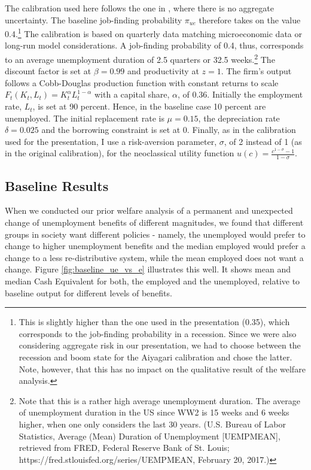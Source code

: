 \documentclass[a4paper,11pt]{article}
\begin{document}
The calibration used here follows the one in \cite{DenHaan20101}, where there is no aggregate uncertainty. The baseline job-finding probability $\pi_{ue}$ therefore takes on the value 0.4.\footnote{This is slightly higher than the one used in the presentation (0.35), which corresponds to the job-finding probability in a recession. Since we were also considering aggregate risk in our presentation, we had to choose between the recession and boom state for the Aiyagari calibration and chose the latter. Note, however, that this has no impact on the qualitative result of the welfare analysis.} The calibration is based on quarterly data matching microeconomic data or long-run model considerations. A job-finding probability of 0.4, thus, corresponds to an average unemployment duration of 2.5 quarters or 32.5 weeks.\footnote{Note that this is a rather high average unemployment duration. The average of unemployment duration in the US since WW2 is 15 weeks and 6 weeks  higher, when one only considers the last 30 years. (U.S. Bureau of Labor Statistics, Average (Mean) Duration of Unemployment [UEMPMEAN], retrieved from FRED, Federal Reserve Bank of St. Louis; https://fred.stlouisfed.org/series/UEMPMEAN, February 20, 2017.)} The discount factor is set at $\beta = 0.99$ and productivity at $z = 1$. The firm's output follows a Cobb-Douglas production function with constant returns to scale $F_{t}(K_{t},L_{t})=K^{\alpha}_{t}L^{1-\alpha}_{t}$ with a capital share, $\alpha$, of 0.36. Initially the employment rate, $L_{t}$, is set at 90 percent. Hence, in the baseline case 10 percent are unemployed. The initial replacement rate is $\mu = 0.15$, the depreciation rate $\delta = 0.025$ and the borrowing constraint is set at 0. Finally, as in the calibration used for the presentation, I use a risk-aversion parameter, $\sigma$, of 2 instead of 1 (as in the original calibration), for the neoclassical utility function $u(c)=\frac{c^{1-\sigma}-1}{1-\sigma}$.

\subsection{Baseline Results}

When we conducted our prior welfare analysis of a permanent and unexpected change of unemployment benefits of different magnitudes, we found that different groups in society want different policies - namely, the unemployed would prefer to change to higher unemployment benefits and the median employed would prefer a change to a less re-distributive system, while the mean employed does not want a change. 
Figure \ref{fig:baseline_ue_vs_e} illustrates this well. It shows mean and median Cash Equivalent for both, the employed and the unemployed, relative to baseline output for different levels of benefits.
\end{document}

